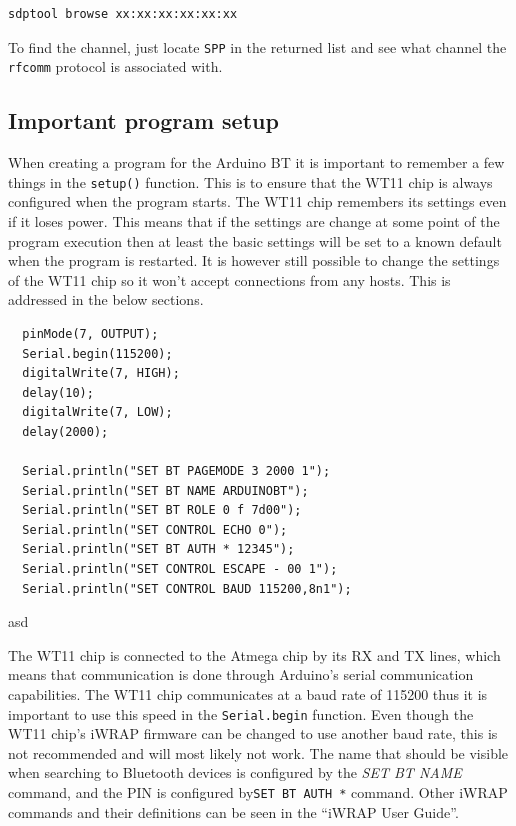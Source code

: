 \documentclass[a4paper, oneside, final]{memoir}
\begin{document}
\begin{verbatim}
sdptool browse xx:xx:xx:xx:xx:xx
\end{verbatim}

To find the channel, just locate \texttt{SPP} in the returned list and see what
channel the \texttt{rfcomm} protocol is associated with.

\subsection{Important program setup}

When creating a program for the Arduino BT it is important to remember a few
things in the \texttt{setup()} function. This is to ensure that the WT11 chip is
always configured when the program starts. The WT11 chip remembers its settings
even if it loses power. This means that if the settings are change at some point
of the program execution then at least the basic settings will be set to a known
default when the program is restarted. It is however still possible to change
the settings of the WT11 chip so it won't accept connections from any
hosts. This is addressed in the below sections.

\begin{table}
  \centering
\begin{verbatim}
  pinMode(7, OUTPUT);
  Serial.begin(115200);
  digitalWrite(7, HIGH);
  delay(10);
  digitalWrite(7, LOW);
  delay(2000);

  Serial.println("SET BT PAGEMODE 3 2000 1");
  Serial.println("SET BT NAME ARDUINOBT");
  Serial.println("SET BT ROLE 0 f 7d00");
  Serial.println("SET CONTROL ECHO 0");
  Serial.println("SET BT AUTH * 12345");
  Serial.println("SET CONTROL ESCAPE - 00 1");
  Serial.println("SET CONTROL BAUD 115200,8n1");
\end{verbatim}
  \caption{asd}
  \label{tab:ArduinoBT:Initial_Setup_code}
\end{table}


The WT11 chip is connected to the Atmega chip by its RX and TX lines, which
means that communication is done through Arduino's serial communication
capabilities. The WT11 chip communicates at a baud rate of 115200 thus it is
important to use this speed in the \texttt{Serial.begin} function. Even though
the WT11 chip's iWRAP firmware can be changed to use another baud rate, this is
not recommended and will most likely not work. The name that should be visible
when searching to Bluetooth devices is configured by the \textit{SET BT NAME}
command, and the PIN is configured by\texttt{SET BT AUTH *} command. Other iWRAP
commands and their definitions can be seen in the ``iWRAP User Guide''.
\end{document}

